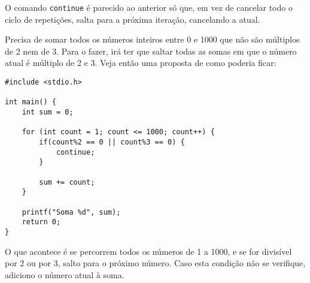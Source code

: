 O comando \texttt{continue} é parecido ao anterior só que, em vez de cancelar todo o ciclo de repetições, salta para a próxima iteração, cancelando a atual.

Precisa de somar todos os números inteiros entre 0 e 1000 que não são múltiplos de 2 nem de 3. Para o fazer, irá ter que saltar todas as somas em que o número atual é múltiplo de 2 e 3. Veja então uma proposta de como poderia ficar:

\begin{lstlisting}
#include <stdio.h>
 
int main() {
    int sum = 0;
    
    for (int count = 1; count <= 1000; count++) {
        if(count%2 == 0 || count%3 == 0) {
            continue;
        }
 
        sum += count;
    }
 
    printf("Soma %d", sum);
    return 0;
}
\end{lstlisting}

O que acontece é se percorrem todos os números de 1 a 1000, e se for divisível por 2 ou por 3, salto para o próximo número. Caso esta condição não se verifique, adiciono o número atual à soma.